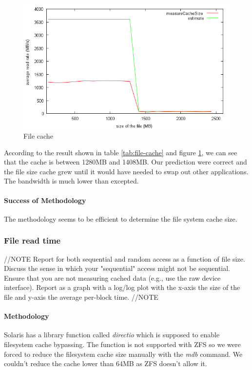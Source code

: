 \begin{figure}[h]
\begin{center}
\includegraphics[scale=0.8]{fileCacheImage}
\end{center}
\caption {File cache\label{fig:file-cache}}

\end{figure}

According to the result shown in table \ref{tab:file-cache} and figure \ref{fig:file-cache}, we can see that the cache
is between 1280MB and 1408MB.
Our prediction were correct and the file size cache grew until it would have
needed to swap out other applications.
The bandwidth is much lower than excepted. 

\paragraph{Success of Methodology}
The methodology seems to be efficient to determine the file system cache size.


\subsubsection{File read time}

//NOTE
Report for both sequential and random access as a function of file size. Discuss the sense in which your "sequential" access might not be sequential. Ensure that you are not measuring cached data (e.g., use the raw device interface). Report as a graph with a log/log plot with the x-axis the size of the file and y-axis the average per-block time.
//NOTE

\paragraph{Methodology}
Solaris has a library function called \emph{directio} which is supposed to
enable filesystem cache bypassing.
The function is not supported with ZFS so we were forced to reduce the
filesystem cache size manually with the \emph{mdb} command\cite{zfs-evil-tuning}.
We couldn't reduce the cache lower than 64MB as ZFS doesn't allow
it\cite{zfs-arc-max}.

